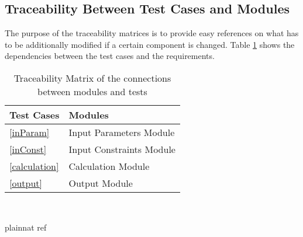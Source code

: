\documentclass[12pt, titlepage]{article}
\begin{document}
\subsection{Traceability Between Test Cases and Modules}
The purpose of the traceability matrices is to provide easy references on what
has to be additionally modified if a certain component is changed. Table 
\ref{Tbltrace} shows the dependencies between the test cases and the 
requirements.

\begin{table}[h!]
	\centering
	\begin{tabular}{l l} 
		\toprule		
		\textbf{Test Cases} & \textbf{Modules}\\
		\midrule 
		\ref{inParam} & Input Parameters Module\\
		\ref{inConst} & Input Constraints Module\\
		\ref{calculation} & Calculation Module\\
		\ref{output} & Output Module \\
		\bottomrule
	\end{tabular}\\

	\caption{Traceability Matrix of the connections between modules and
	tests} 
	\label{Tbltrace}
\end{table}
				
\newpage

\nocite{*}
 {plainnat}
 {ref}








\end{document}
